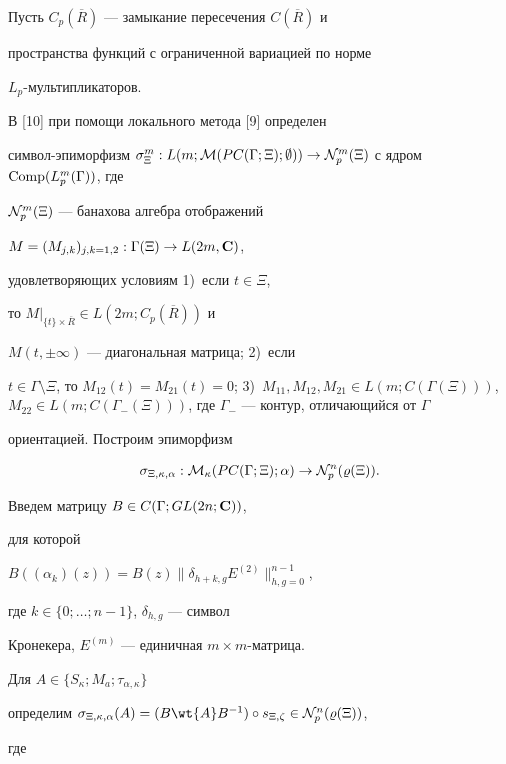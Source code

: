 Пусть $C_p(\overline{R})$ --- замыкание пересечения $C(\overline{R})$ и


пространства функций с ограниченной вариацией по норме


$L_p$-мультипликаторов.


В [10] при помощи локального метода [9] определен


символ-эпиморфизм $\sigma_\Xi^m:L(m;{\cal M} (PC(\Gamma ;\Xi);\emptyset))


\to{\cal N}_p^m(\Xi)$ с ядром $\Comp(L_p^m(\Gamma))$, где


${\cal N}_p^m(\Xi)$ --- банахова алгебра отображений


$M=(M_{j,k})_{j,k=1,2}:\Gamma (\Xi)\to L(2m,{\bold C})$,


удовлетворяющих условиям 1)~если $t\in\Xi$,


то $M|_{\{t\}\times\overline{R}}\in L(2m;C_p(\overline{R}))$ и


$M(t,\pm\infty)$ --- диагональная матрица; 2)~если


$t\in\Gamma\setminus\Xi$, то $M_{12}(t)=M_{21}(t)=0$; 3)~$M_{11},


M_{12},M_{21}\in L(m;C(\Gamma (\Xi)))$, $M_{22}\in L(m;C(\Gamma_-


(\Xi)))$, где $\Gamma_-$ --- контур, отличающийся от $\Gamma$


ориентацией. Построим эпиморфизм


\begin{equation}


\sigma_{\Xi,\kappa,\alpha}:{\cal M}_\kappa (PC(\Gamma ;\Xi);


\alpha)\to{\cal N}_p^n(\varrho (\Xi)).


\end{equation}


Введем матрицу $B\in C(\Gamma ;GL(2n;{\bold C}))$,


для которой


$B((\alpha_k)(z))=B(z) \|\delta_{h+k,g}E^{(2)}\|_{h,g=0}^{n-1}$,


где $k\in\{ 0;\dotsc ;n-1\}$, $\delta_{h,g}$ --- символ


Кронекера, $E^{(m)}$ --- единичная $m\times m$-матрица.


Для $A\in\{S_\kappa ;M_a;\tau_{\alpha,\kappa}\}$


определим $\sigma_{\Xi,\kappa,\alpha}(A)=(B \wt{A}


B^{-1})\circ s_{\Xi,\zeta} \in{\cal N}_p^n(\varrho (\Xi))$,


где


